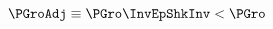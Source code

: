 \begin{equation}\begin{gathered}\begin{aligned}
      \PGroAdj & \equiv \PGro \InvEpShkInv < \PGro \label{eq:PGroAdj}
\end{aligned}\end{gathered}\end{equation}
